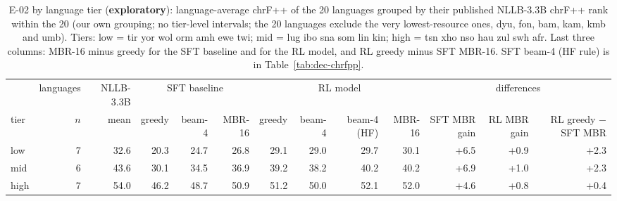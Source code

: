 \begin{table}[htbp]
\centering\footnotesize\setlength{\tabcolsep}{3pt}
\caption{E-02 by language tier (\textbf{exploratory}): language-average chrF++ of the 20 languages grouped by their published NLLB-3.3B chrF++ rank within the 20 (our own grouping; no tier-level intervals; the 20 languages exclude the very lowest-resource ones, dyu, fon, bam, kam, kmb and umb). Tiers: low = tir yor wol orm amh ewe twi; mid = lug ibo sna som lin kin; high = tsn xho nso hau zul swh afr. Last three columns: MBR-16 minus greedy for the SFT baseline and for the RL model, and RL greedy minus SFT MBR-16. SFT beam-4 (HF rule) is in Table~\ref{tab:dec-chrfpp}.}\label{tab:dec-tier}
\begin{adjustbox}{max width=\linewidth}\begin{tabular}{@{}lrrrrrrrrrrrr@{}}
\toprule
 & languages & NLLB-3.3B & \multicolumn{3}{c}{SFT baseline} & \multicolumn{4}{c}{RL model} & \multicolumn{3}{c}{differences}\\
\cmidrule(lr){4-6}\cmidrule(lr){7-10}\cmidrule(lr){11-13}
tier & $n$ & mean & greedy & beam-4 & MBR-16 & greedy & beam-4 & beam-4 (HF) & MBR-16 & SFT MBR gain & RL MBR gain & RL greedy $-$ SFT MBR\\
\midrule
low & 7 & 32.6 & 20.3 & 24.7 & 26.8 & 29.1 & 29.0 & 29.7 & 30.1 & +6.5 & +0.9 & +2.3 \\
mid & 6 & 43.6 & 30.1 & 34.5 & 36.9 & 39.2 & 38.2 & 40.2 & 40.2 & +6.9 & +1.0 & +2.3 \\
high & 7 & 54.0 & 46.2 & 48.7 & 50.9 & 51.2 & 50.0 & 52.1 & 52.0 & +4.6 & +0.8 & +0.4 \\
\bottomrule
\end{tabular}\end{adjustbox}
\end{table}
